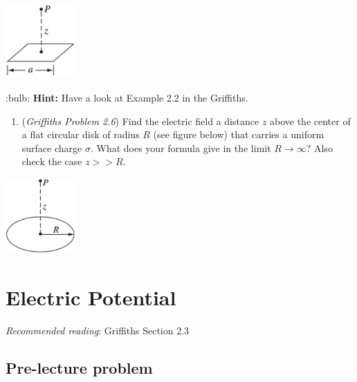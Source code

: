 \documentclass[
  letterpaper,
  DIV=11,
  numbers=noendperiod]{scrreprt}
\providecommand{\tightlist}{%
  \setlength{\itemsep}{0pt}\setlength{\parskip}{0pt}}\usepackage{longtable,booktabs,array}
\begin{document}
\includegraphics[width=1.04167in,height=\textheight]{Figures/L1_prob3.png}

:bulb: \textbf{Hint:} Have a look at Example 2.2 in the Griffiths.

\begin{enumerate}
\def\labelenumi{\arabic{enumi})}
\setcounter{enumi}{3}
\tightlist
\item
  (\emph{Griffiths Problem 2.6}) Find the electric field a distance
  \(z\) above the center of a flat circular disk of radius \(R\) (see
  figure below) that carries a uniform surface charge \(\sigma\). What
  does your formula give in the limit \(R \rightarrow \infty\)? Also
  check the case \(z >> R\).
\end{enumerate}

\includegraphics[width=1.04167in,height=\textheight]{Figures/L1_prob4.png}


\chapter{Electric Potential}\label{electric-potential}

\newcommand{\l}{\mathrm{\mathbf{l}}}
\newcommand{\E}{\mathrm{\mathbf{E}}}
\newcommand{\F}{\mathrm{\mathbf{F}}}
\newcommand{\r}{\mathrm{\mathbf{r}}}

\newcommand{\x}{\mathrm{\mathbf{x}}}
\newcommand{\y}{\mathrm{\mathbf{y}}}
\newcommand{\z}{\mathrm{\mathbf{z}}}

\newcommand{\a}{\mathrm{\mathbf{a}}}
\newcommand{\b}{\mathrm{\mathbf{b}}}

\emph{Recommended reading}: Griffiths Section 2.3

\section{Pre-lecture problem}\label{pre-lecture-problem-1}
\end{document}
